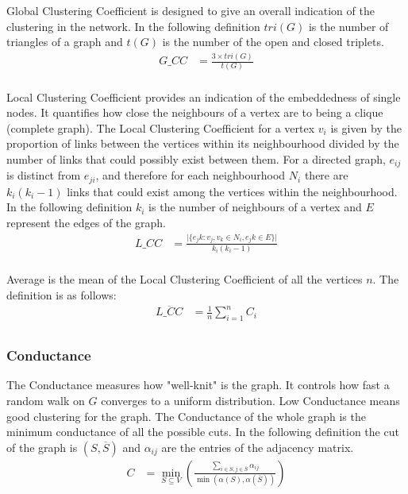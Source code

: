 Global Clustering Coefficient is designed to give an overall indication of the clustering in the network. In the following definition ${\textstyle tri(G)}$ is the number of triangles of a graph and ${\textstyle t(G)}$ is the number of the open and closed triplets.
\begin{align*}
  G\_CC &= \frac{ 3 \times tri(G) }{ t(G) }\\
\end{align*}

Local Clustering Coefficient provides an indication of the embeddedness of single nodes. It quantifies how close the neighbours of a vertex are to being a clique (complete graph). The Local Clustering Coefficient for a vertex ${\textstyle v_i}$ is given by the proportion of links between the vertices within its neighbourhood divided by the number of links that could possibly exist between them. For a directed graph, ${\textstyle e_{ij}}$ is distinct from ${\textstyle e_{ji}}$,  and therefore for each neighbourhood ${\textstyle N_i}$ there are ${\textstyle k_i (k_i - 1)}$ links that could exist among the vertices within the neighbourhood. In the following definition ${\textstyle k_i}$ is the number of neighbours of a vertex and ${\textstyle E}$ represent the edges of the graph.
\begin{align*}
  L\_CC &= \frac{\vert{\{e_jk : v_j,v_k \in N_i ,e_jk \in E\}}\vert}{k_i (k_i - 1)}\\
\end{align*}

Average is the mean of the Local Clustering Coefficient of all the vertices ${\textstyle n}$. The definition is as follows:
\begin{align*}
  \overline{L\_CC} &= \frac{1}{n} \sum_{i=1}^{n} C_i\\
\end{align*}



\subsubsection{Conductance}
The Conductance measures how "well-knit" is the graph. It controls how fast a random walk on ${\textstyle G}$ converges to a uniform distribution. Low Conductance means good clustering for the graph. The Conductance of the whole graph is the minimum conductance of all the possible cuts. In the following definition the cut of the graph is ${\textstyle (S,\overline{S})}$ and ${\textstyle \alpha_{ij}}$ are the entries of the adjacency matrix.
\begin{align*}
 	C &= \displaystyle\min_{S \subseteq V} ( \frac{\sum_{i \in S,j \in \overline{S}} \alpha_{ij} }{\min ( \alpha (S), \alpha ( \overline{S} ) )} ) 
\end{align*}



